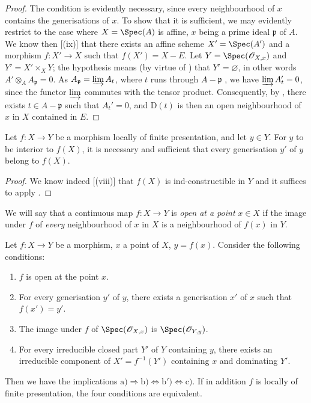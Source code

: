 \begin{proof}
The condition is evidently necessary, since every neighbourhood of $x$ contains the generisations of $x$.
To show that it is sufficient, we may evidently restrict to the case where $X=\Spec(A)$ is affine, $x$ being a prime ideal $\mathfrak{p}$ of $A$.
We know then [(ix)] that there exists an affine scheme $X'=\Spec(A')$ and a morphism $f:X'\to X$ such that $f(X')=X-E$.
Let $Y=\Spec(\mathcal{O}_{X,x})$ and $Y'=X'\times_X Y$; the hypothesis means (by virtue of ) that $Y'=\varnothing$, in other words $A'\otimes_A A_\mathfrak{p}=0$.
As $A_\mathfrak{p}=\varinjlim A_t$, where $t$ runs through $A-\mathfrak{p}$ , we have $\varinjlim A_t'=0$, since the functor $\varinjlim$ commutes with the tensor product.
Consequently, by , there exists $t\in A-\mathfrak{p}$ such that $A_t'=0$, and $\mathrm{D}(t)$ is then an open neighbourhood of $x$ in $X$ contained in $E$.
\end{proof}

\begin{corollary}[1.10.2]
\label{IV.1.10.2}
Let $f:X\to Y$ be a morphism locally of finite presentation, and let $y\in Y$.
For $y$ to be interior to $f(X)$, it is necessary and sufficient that every generisation $y'$ of $y$ belong to $f(X)$.
\end{corollary}

\begin{proof}
We know indeed [(viii)] that $f(X)$ is ind-constructible in $Y$ and it suffices to apply .
\end{proof}

We will say that a continuous map $f:X\to Y$ is \emph{open at a point} $x\in X$ if the image under $f$ of \emph{every} neighbourhood of $x$ in $X$ is a neighbourhood of $f(x)$ in $Y$.

\begin{proposition}[1.10.3]
\label{IV.1.10.3}
Let $f:X\to Y$ be a morphism, $x$ a point of $X$, $y=f(x)$.
Consider the following conditions:
\begin{enumerate}
  \item[\rm a)] $f$ is open at the point $x$.
  \item[\rm b)] For every generisation $y'$ of $y$, there exists a generisation $x'$ of $x$ such that $f(x')=y'$.
  \item[\rm b$'$)] The image under $f$ of $\Spec(\mathcal{O}_{X,x})$ is $\Spec(\mathcal{O}_{Y,y})$.
  \item[\rm c)] For every irreducible closed part $Y'$ of $Y$ containing $y$, there exists an irreducible component of $X'=f^{-1}(Y')$ containing $x$ and dominating $Y'$.
\end{enumerate}
Then we have the implications $\mathrm{a)}\Rightarrow\mathrm{b)}\Leftrightarrow\mathrm{b')}\Leftrightarrow\mathrm{c)}$.
If in addition $f$ is locally of finite presentation, the four conditions are equivalent.
\end{proposition}

